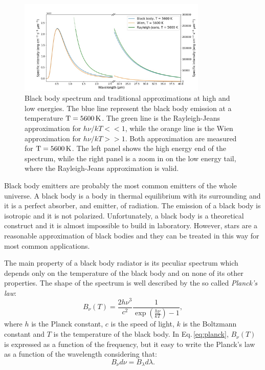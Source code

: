 \documentclass[../main.tex]{subfiles}
\begin{document}
\begin{figure}
\centering
\includegraphics[width=0.8\textwidth]{images/BB.jpg} 
\caption[]{Black body spectrum and traditional approximations at high and low energies. The blue line represent the black body emission at a temperature $\rm T = 5600\,\si{K}$. The green line is the Rayleigh-Jeans approximation for $h\nu/kT<<1$, while the orange line is the Wien approximation for $h\nu/kT>>1$. Both approximation are measured for $\rm T = 5600\,\si{K}$. The left panel shows the high energy end of the spectrum, while the right panel is a zoom in on the low energy tail, where the Rayleigh-Jeans approximation  is valid.}
\label{fig:BB_emission}
\end{figure}

Black body emitters are probably the most common emitters of the whole universe.
A black body is a body in thermal equilibrium with its surrounding and it is a perfect absorber, and emitter, of radiation.
The emission of a black body is isotropic and it is not polarized.
Unfortunately, a black body is a theoretical construct and it is almost impossible to build in laboratory.
However, stars are a reasonable approximation of black bodies and they can be treated in this way for most common applications.

The main property of a black body radiator is its peculiar spectrum which depends only on the temperature of the black body and on none of its other properties.
The shape of the spectrum is well described by the so called \emph{Planck's law}:
\begin{equation}
    \label{eq:planck}
    B_{\nu}(T) = \frac{2h\nu^3}{c^2}\frac{1}{\exp{\left(\frac{h\nu}{kT}\right)} - 1},
\end{equation}
where $h$ is the Planck constant, $c$ is the speed of light, $k$ is the Boltzmann constant and $T$ is the temperature of the black body.
In Eq.\,\ref{eq:planck}, $B_{\nu}(T)$ is expressed as a function of the frequency, but it easy to write the Planck's law as a function of the wavelength considering that:
\begin{equation}
    \label{eq:transform}
    B_{\nu}d\nu = B_{\lambda}d\lambda.
\end{equation}
\end{document}
